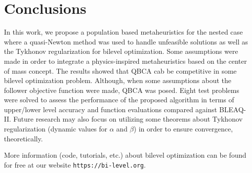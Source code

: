 \documentclass[conference]{IEEEtran}
\theoremstyle{definition}
\begin{document}
\section{Conclusions} %
\label{sec:conclusions}


In this work, we propose a population based metaheuristics for the nested case 
where a quasi-Newton method was used to handle unfeasible solutions as well as the 
Tykhonov regularization for bilevel optimization. Some assumptions were made in order
to integrate a physics-inspired metaheuristics based on the center of mass concept.
The results showed that QBCA cab be competitive in some bilevel optimization problem.
Although, when some assumptions about the follower objective function were made,
QBCA was posed. Eight test problems were solved to assess the performance of the
proposed algorithm in terms of upper/lower level accuracy and function evaluations
compared against BLEAQ-II. Future research may also focus on utilizing some theorems
about Tykhonov regularization (dynamic values for $\alpha$ and $\beta$) in order
to ensure convergence, theoretically.


More information (code, tutorials, etc.) about bilevel optimization can be found
for free at our website \verb|https://bi-level.org|.





\end{document}
